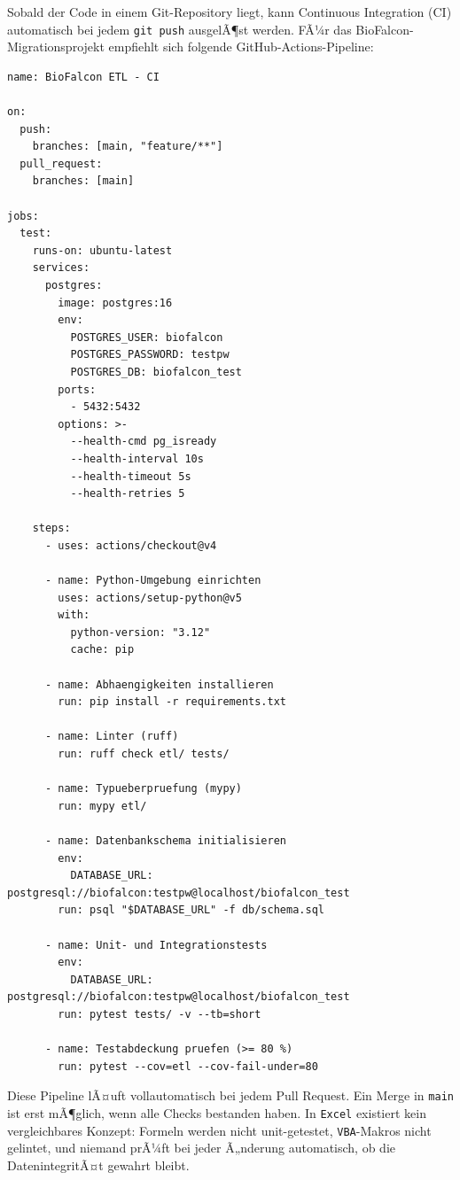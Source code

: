 ﻿\documentclass[12pt,a4paper]{report}
\theoremstyle{definition}
\theoremstyle{remark}
\newcommand{\excel}{\texttt{Excel}}
\newcommand{\vba}{\texttt{VBA}}
\newcommand{\code}[1]{\texttt{#1}}
\begin{document}
Sobald der Code in einem Git-Repository liegt, kann Continuous Integration
(CI) automatisch bei jedem \code{git push} ausgelÃ¶st werden.
FÃ¼r das BioFalcon-Migrationsprojekt empfiehlt sich folgende
GitHub-Actions-Pipeline:

\begin{lstlisting}[style=yaml, caption={.github/workflows/ci.yml -- Automatisierte Tests und Lint}]
name: BioFalcon ETL - CI

on:
  push:
    branches: [main, "feature/**"]
  pull_request:
    branches: [main]

jobs:
  test:
    runs-on: ubuntu-latest
    services:
      postgres:
        image: postgres:16
        env:
          POSTGRES_USER: biofalcon
          POSTGRES_PASSWORD: testpw
          POSTGRES_DB: biofalcon_test
        ports:
          - 5432:5432
        options: >-
          --health-cmd pg_isready
          --health-interval 10s
          --health-timeout 5s
          --health-retries 5

    steps:
      - uses: actions/checkout@v4

      - name: Python-Umgebung einrichten
        uses: actions/setup-python@v5
        with:
          python-version: "3.12"
          cache: pip

      - name: Abhaengigkeiten installieren
        run: pip install -r requirements.txt

      - name: Linter (ruff)
        run: ruff check etl/ tests/

      - name: Typueberpruefung (mypy)
        run: mypy etl/

      - name: Datenbankschema initialisieren
        env:
          DATABASE_URL: postgresql://biofalcon:testpw@localhost/biofalcon_test
        run: psql "$DATABASE_URL" -f db/schema.sql

      - name: Unit- und Integrationstests
        env:
          DATABASE_URL: postgresql://biofalcon:testpw@localhost/biofalcon_test
        run: pytest tests/ -v --tb=short

      - name: Testabdeckung pruefen (>= 80 %)
        run: pytest --cov=etl --cov-fail-under=80
\end{lstlisting}

Diese Pipeline lÃ¤uft vollautomatisch bei jedem Pull Request.
Ein Merge in \code{main} ist erst mÃ¶glich, wenn alle Checks
bestanden haben. In \excel{} existiert kein vergleichbares
Konzept: Formeln werden nicht unit-getestet, \vba-Makros nicht
gelintet, und niemand prÃ¼ft bei jeder Ã„nderung automatisch,
ob die DatenintegritÃ¤t gewahrt bleibt.
\end{document}
